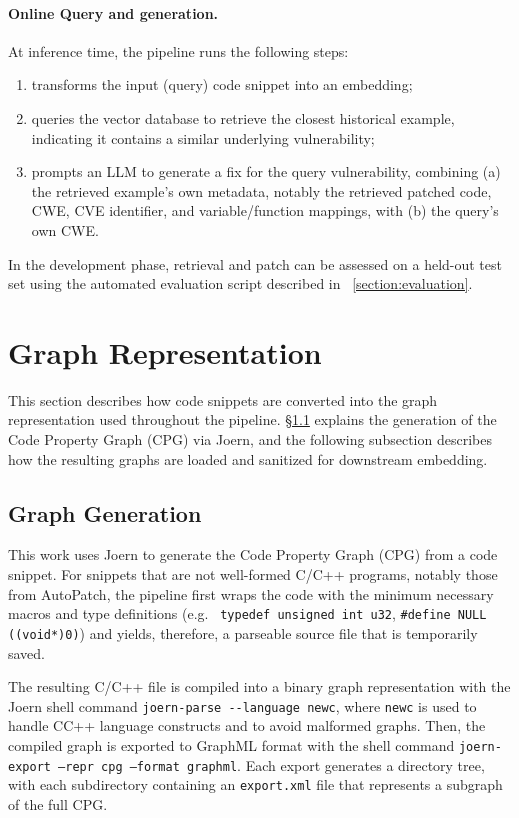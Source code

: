 \paragraph{Online Query and generation.} At inference time, the pipeline runs the following steps:
\begin{enumerate}
  \item transforms the input (query) code snippet into an embedding;
  \item queries the vector database to retrieve the closest historical example, indicating it contains a similar underlying vulnerability;
  \item prompts an LLM to generate a fix for the query vulnerability, combining (a) the retrieved example's own metadata, notably the retrieved patched code, CWE, CVE identifier, and variable/function mappings, with (b) the query's own CWE.
\end{enumerate}

In the development phase, retrieval and patch can be assessed on a held-out test set using the automated evaluation script described in ~\ref{section:evaluation}.

\section{Graph Representation}\label{sec:graph-representation}
This section describes how code snippets are converted into the graph representation used throughout the pipeline. 
\S\ref{sec:graph-generation} explains the generation of the Code Property Graph (CPG) via Joern, and the following subsection describes how the resulting graphs are loaded and sanitized for downstream embedding.

\subsection{Graph Generation}\label{sec:graph-generation}

This work uses Joern to generate the Code Property Graph (CPG) from a code snippet. 
For snippets that are not well-formed C/C++ programs, notably those from AutoPatch, the pipeline first wraps the code with the minimum necessary macros and type definitions (e.g. \ \verb|typedef unsigned int u32|, \verb|#define NULL ((void*)0)|) and yields, therefore, a parseable source file that is temporarily saved.

The resulting C/C++ file is compiled into a binary graph representation with the Joern shell command \verb|joern-parse --language newc|, where \verb|newc| is used to handle C\/C++ language constructs and to avoid malformed graphs.  
Then, the compiled graph is exported to GraphML format with the shell command \texttt{joern-export --repr cpg --format graphml}. 
Each export generates a directory tree, with each subdirectory containing an \verb|export.xml| file that represents a subgraph of the full CPG.

